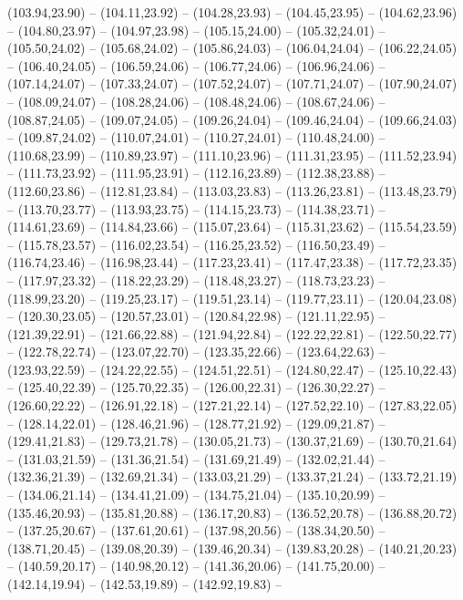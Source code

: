 {  (103.94,23.90) -- (104.11,23.92) -- (104.28,23.93) -- (104.45,23.95) -- (104.62,23.96) -- (104.80,23.97) -- (104.97,23.98) --
  (105.15,24.00) -- (105.32,24.01) -- (105.50,24.02) -- (105.68,24.02) -- (105.86,24.03) -- (106.04,24.04) -- (106.22,24.05) --
  (106.40,24.05) -- (106.59,24.06) -- (106.77,24.06) -- (106.96,24.06) -- (107.14,24.07) -- (107.33,24.07) -- (107.52,24.07) --
  (107.71,24.07) -- (107.90,24.07) -- (108.09,24.07) -- (108.28,24.06) -- (108.48,24.06) -- (108.67,24.06) -- (108.87,24.05) --
  (109.07,24.05) -- (109.26,24.04) -- (109.46,24.04) -- (109.66,24.03) -- (109.87,24.02) -- (110.07,24.01) -- (110.27,24.01) --
  (110.48,24.00) -- (110.68,23.99) -- (110.89,23.97) -- (111.10,23.96) -- (111.31,23.95) -- (111.52,23.94) -- (111.73,23.92) --
  (111.95,23.91) -- (112.16,23.89) -- (112.38,23.88) -- (112.60,23.86) -- (112.81,23.84) -- (113.03,23.83) -- (113.26,23.81) --
  (113.48,23.79) -- (113.70,23.77) -- (113.93,23.75) -- (114.15,23.73) -- (114.38,23.71) -- (114.61,23.69) -- (114.84,23.66) --
  (115.07,23.64) -- (115.31,23.62) -- (115.54,23.59) -- (115.78,23.57) -- (116.02,23.54) -- (116.25,23.52) -- (116.50,23.49) --
  (116.74,23.46) -- (116.98,23.44) -- (117.23,23.41) -- (117.47,23.38) -- (117.72,23.35) -- (117.97,23.32) -- (118.22,23.29) --
  (118.48,23.27) -- (118.73,23.23) -- (118.99,23.20) -- (119.25,23.17) -- (119.51,23.14) -- (119.77,23.11) -- (120.04,23.08) --
  (120.30,23.05) -- (120.57,23.01) -- (120.84,22.98) -- (121.11,22.95) -- (121.39,22.91) -- (121.66,22.88) -- (121.94,22.84) --
  (122.22,22.81) -- (122.50,22.77) -- (122.78,22.74) -- (123.07,22.70) -- (123.35,22.66) -- (123.64,22.63) -- (123.93,22.59) --
  (124.22,22.55) -- (124.51,22.51) -- (124.80,22.47) -- (125.10,22.43) -- (125.40,22.39) -- (125.70,22.35) -- (126.00,22.31) --
  (126.30,22.27) -- (126.60,22.22) -- (126.91,22.18) -- (127.21,22.14) -- (127.52,22.10) -- (127.83,22.05) -- (128.14,22.01) --
  (128.46,21.96) -- (128.77,21.92) -- (129.09,21.87) -- (129.41,21.83) -- (129.73,21.78) -- (130.05,21.73) -- (130.37,21.69) --
  (130.70,21.64) -- (131.03,21.59) -- (131.36,21.54) -- (131.69,21.49) -- (132.02,21.44) -- (132.36,21.39) -- (132.69,21.34) --
  (133.03,21.29) -- (133.37,21.24) -- (133.72,21.19) -- (134.06,21.14) -- (134.41,21.09) -- (134.75,21.04) -- (135.10,20.99) --
  (135.46,20.93) -- (135.81,20.88) -- (136.17,20.83) -- (136.52,20.78) -- (136.88,20.72) -- (137.25,20.67) -- (137.61,20.61) --
  (137.98,20.56) -- (138.34,20.50) -- (138.71,20.45) -- (139.08,20.39) -- (139.46,20.34) -- (139.83,20.28) -- (140.21,20.23) --
  (140.59,20.17) -- (140.98,20.12) -- (141.36,20.06) -- (141.75,20.00) -- (142.14,19.94) -- (142.53,19.89) -- (142.92,19.83) --
}
